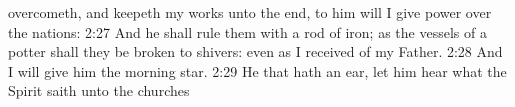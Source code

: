 \documentclass{article}
\begin{document}
overcometh, and keepeth my works unto the end, to him will I give power over the nations: {2:27} And he shall rule them with a rod of iron; as the vessels of a potter shall they be broken to shivers: even as I received of my Father. {2:28} And I will give him the morning star. {2:29} He that hath an ear, let him hear what the Spirit saith unto the churches
\end{document}
